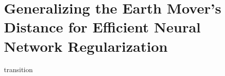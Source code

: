 \chapter{Generalizing the Earth Mover's Distance for Efficient Neural Network Regularization}\label{chap:demd}

transition






